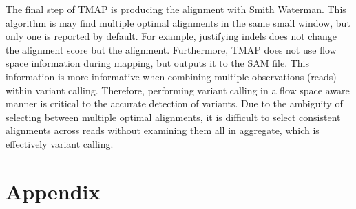 \documentclass[a4paper,12pt]{book}
\begin{document}
The final step of TMAP is producing the alignment with Smith Waterman.
This algorithm is may find multiple optimal alignments in the same small window, but only one is reported by default.
For example, justifying indels does not change the alignment score but the alignment. 
Furthermore, TMAP does not use flow space information during mapping, but outputs it to the SAM file.  
This information is more informative when combining multiple observations (reads) within variant calling.
Therefore, performing variant calling in a flow space aware manner is critical to the accurate detection of variants. 
Due to the ambiguity of selecting between multiple optimal alignments, it is difficult to select consistent alignments across reads without examining them all in aggregate, which is effectively variant calling.

\chapter{Appendix}

{}


\end{document}
